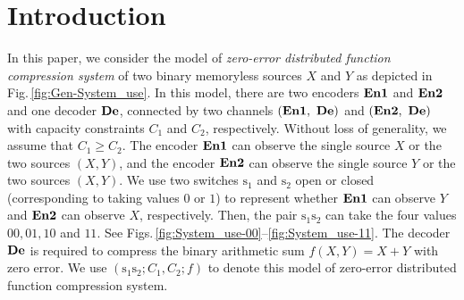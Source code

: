 \documentclass[11pt,draftclsnofoot,onecolumn]{IEEEtran}
\newcommand{\Enone}{\bf{En1}}
\newcommand{\Entwo}{\bf{En2}}
\newcommand{\De}{\bf{De}}
\begin{document}
\section{ Introduction}

In this paper, we consider the model of \emph{zero-error distributed function compression system} of two binary memoryless sources $X$ and $Y$ as depicted in Fig.\,\ref{fig:Gen-System_use}. In this model, there are two encoders $\Enone$ and $\Entwo$ and one decoder $\De$, connected by two channels $(\Enone,~\De)$ and $(\Entwo,~\De)$ with capacity constraints $C_1$ and $C_2$, respectively. Without loss of generality, we assume that $C_1\geq C_2$. The encoder $\Enone$ can observe the single source $X$ or the two sources $(X,Y)$, and the encoder $\Entwo$ can observe the single source $Y$ or the two sources $(X,Y)$. We use two switches $\boldsymbol{\mathrm{s}}_1$ and $\boldsymbol{\mathrm{s}}_2$ open or closed (corresponding to taking values $0$ or $1$) to represent whether $\Enone$ can observe $Y$ and $\Entwo$ can observe $X$, respectively. Then, the pair $\boldsymbol{\mathrm{s}}_1\boldsymbol{\mathrm{s}}_2$ can take the four values $00,01,10$ and $11$. See Figs.\,\ref{fig:System_use-00}--\ref{fig:System_use-11}. The decoder $\De$ is required to compress the binary arithmetic sum $f(X,Y)=X+Y$ with zero error. %
We use $(\boldsymbol{\mathrm{s}}_1\boldsymbol{\mathrm{s}}_2;C_{1}, C_{2};  f)$ to denote this model of zero-error distributed function compression system.
\end{document}
